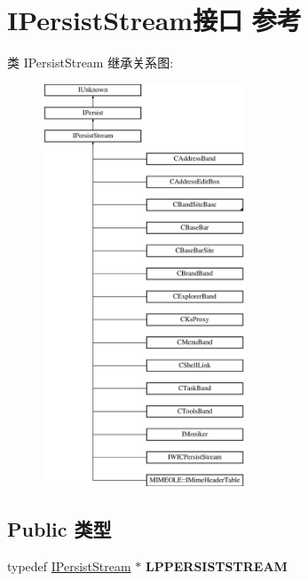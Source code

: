 \hypertarget{interface_i_persist_stream}{}\section{I\+Persist\+Stream接口 参考}
\label{interface_i_persist_stream}
类 I\+Persist\+Stream 继承关系图\+:\begin{figure}[H]
\begin{center}
\leavevmode
\includegraphics[height=12.000000cm]{interface_i_persist_stream}
\end{center}
\end{figure}
\subsection*{Public 类型}
\begin{DoxyCompactItemize}
\item 
\mbox{\label{interface_i_persist_stream_a8f88cfd0a716fba78bb1f425870e7a10}} 
typedef \hyperlink{interface_i_persist_stream}{I\+Persist\+Stream} $\ast$ {\bfseries L\+P\+P\+E\+R\+S\+I\+S\+T\+S\+T\+R\+E\+AM}
\end{DoxyCompactItemize}
